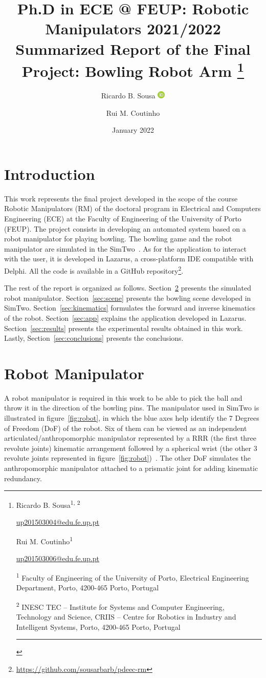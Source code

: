 \documentclass[10pt,a4paper,notitlepage,twocolumn,twoside]{article}
\title{\Large Ph.D in ECE @ FEUP: Robotic Manipulators 2021/2022\\
\LARGE Summarized Report of the Final Project: Bowling Robot Arm%
\thanks{%
\noindent Ricardo B. Sousa\textsuperscript{1, 2}

\noindent \href{mailto:up201503004@edu.fe.up.pt}{up201503004@edu.fe.up.pt}

\vspace{0.5em}
\noindent Rui M. Coutinho\textsuperscript{1}

\noindent \href{mailto:up201503006@edu.fe.up.pt}{up201503006@edu.fe.up.pt}

\vspace{1em}
\noindent \textsuperscript{1} Faculty of Engineering of the University of Porto, Electrical Engineering Department, Porto, 4200-465 Porto, Portugal

\noindent \textsuperscript{2} INESC TEC -- Institute for Systems and Computer Engineering, Technology and Science, CRIIS -- Centre for Robotics in Industry and Intelligent Systems, Porto, 4200-465 Porto, Portugal
\vspace{-3pt}\rule{\columnwidth}{0.1pt}\vspace{4.5pt}
}}
\author{%
Ricardo B. Sousa
\href{https://orcid.org/0000-0003-4537-5095}{\includegraphics[width=1em]{orcid.pdf}}%
\and%
Rui M. Coutinho%
}
\date{January 2022}
\begin{document}
\maketitle

\section{Introduction}
\label{sec:intro}

This work represents the final project developed in the scope of the course Robotic Manipulators (RM) of the doctoral program in Electrical and Computers Engineering (ECE) at the Faculty of Engineering of the University of Porto (FEUP). The project consists in developing an automated system based on a robot manipulator for playing bowling. The bowling game and the robot manipulator are simulated in the SimTwo~\cite{simtwo:article,simtwo:github}. As for the application to interact with the user, it is developed in Lazarus, a cross-platform IDE compatible with Delphi. All the code is available in a GitHub repository\footnote{\url{https://github.com/sousarbarb/pdeec-rm}}.

The rest of the report is organized as follows. Section~\ref{sec:robot} presents the simulated robot manipulator. Section~\ref{sec:scene} presents the bowling scene developed in SimTwo. Section~\ref{sec:kinematics} formulates the forward and inverse kinematics of the robot. Section~\ref{sec:app} explains the application developed in Lazarus. Section~\ref{sec:results} presents the experimental results obtained in this work. Lastly, Section~\ref{sec:conclusions} presents the conclusions.

\section{Robot Manipulator}
\label{sec:robot}

A robot manipulator is required in this work to be able to pick the ball and throw it in the direction of the bowling pins. The manipulator used in SimTwo is illustrated in figure~\ref{fig:robot}, in which the blue axes help identify the 7 Degrees of Freedom (DoF) of the robot. Six of them can be viewed as an independent articulated/anthropomorphic manipulator represented by a RRR (the first three revolute joints) kinematic arrangement followed by a spherical wrist (the other 3 revolute joints represented in figure~\ref{fig:robot})~\cite{book:spong:2005}. The other DoF simulates the anthropomorphic manipulator attached to a prismatic joint for adding kinematic redundancy.
\end{document}
